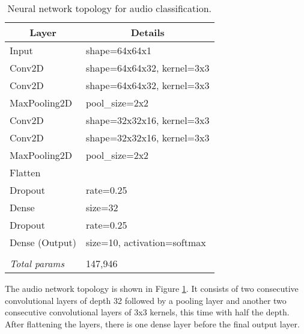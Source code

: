\begin{table}[thbp]
\centering
\caption{Neural network topology for audio classification.}
\label{tab:audio_nn_topo}
\begin{tabular}{|l|l|}
\hline
\multicolumn{1}{|c|}{\textbf{Layer}}          & \multicolumn{1}{|c|}{\textbf{Details}}                     \\ \hline
Input          & shape=64x64x1               \\ \hline
Conv2D         & shape=64x64x32, kernel=3x3  \\ \hline
Conv2D         & shape=64x64x32, kernel=3x3  \\ \hline
MaxPooling2D   & pool\_size=2x2              \\ \hline
Conv2D         & shape=32x32x16, kernel=3x3  \\ \hline
Conv2D         & shape=32x32x16, kernel=3x3  \\ \hline
MaxPooling2D   & pool\_size=2x2              \\ \hline
Flatten        &                             \\ \hline
Dropout        & rate=0.25                   \\ \hline
Dense          & size=32                     \\ \hline
Dropout        & rate=0.25                   \\ \hline
Dense (Output) & size=10, activation=softmax \\ \hline
               &                             \\ \hline
\textit{Total params}   & 147,946                      \\ \hline
\end{tabular}
\end{table}

The audio network topology is shown in Figure \ref{tab:audio_nn_topo}. It consists of two consecutive convolutional layers of depth 32 followed by a pooling layer and another two consecutive convolutional layers of 3x3 kernels, this time with half the depth. After flattening the layers, there is one dense layer before the final output layer.

